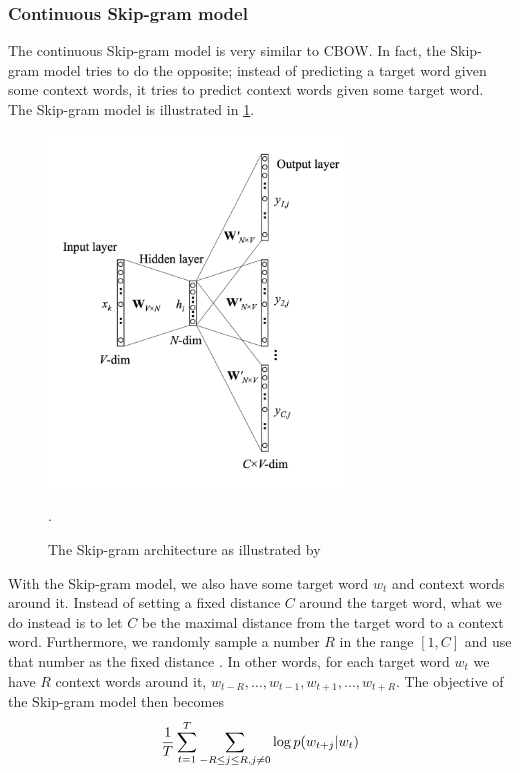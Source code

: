 \subsubsection{Continuous Skip-gram model}
The continuous Skip-gram model is very similar to CBOW. In fact, the Skip-gram model tries to do the opposite; instead of predicting a target word given some context words, it tries to predict context words given some target word. The Skip-gram model is illustrated in \cref{fig:skip-gram-model}.

\begin{figure}[ht]
    \centering
    \includegraphics[width=8cm]{thesis/figures/skip-gram-rong-2016.png}
    \caption{The Skip-gram architecture as illustrated by  \cite{rong2016word2vec}}.
    \label{fig:skip-gram-model}
\end{figure}


With the Skip-gram model, we also have some target word $w_t$ and context words around it. Instead of setting a fixed distance $C$ around the target word, what we do instead is to let $C$ be the maximal distance from the target word to a context word. Furthermore, we randomly sample a number $R$ in the range $[1, C]$ and use that number as the fixed distance \cite{mikolov2013a}. In other words, for each target word $w_t$ we have $R$ context words around it, $w_{t-R}, \ldots, w_{t-1}, w_{t+1}, \ldots, w_{t+R}$. The objective of the Skip-gram model \cite{mikolov2013b} then becomes
\begin{align}
    \frac{1}{T} \sum\limits_{t=1}^{T} \sum\limits_{-R \leq j \leq R, j \neq 0}^{} \log  p(w_{t+j} | w_t)
    \label{eqn:skip-gram-objective-function}
\end{align}


